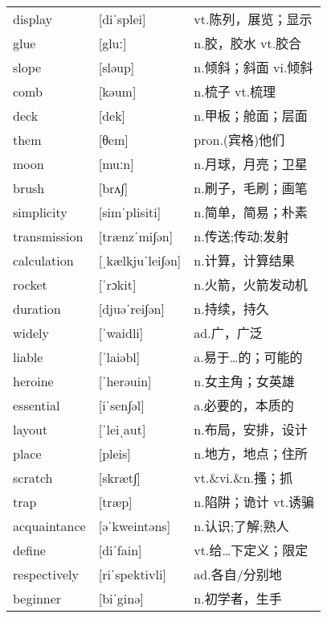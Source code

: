 \documentclass[a4paper]{article}
\begin{document}
\section{}
\begin{tabular}{l l l}

display & [diˈsplei] & vt.陈列，展览；显示 \\
glue & [gluː] & n.胶，胶水 vt.胶合 \\
slope & [sləup] & n.倾斜；斜面 vi.倾斜 \\
comb & [kəum] & n.梳子 vt.梳理 \\
deck & [dek] & n.甲板；舱面；层面 \\
them & [θem] & pron.(宾格)他们 \\
moon & [muːn] & n.月球，月亮；卫星 \\
brush & [brʌ∫] & n.刷子，毛刷；画笔 \\
simplicity & [simˈplisiti] & n.简单，简易；朴素 \\
transmission & [trænzˈmi∫ən] & n.传送;传动;发射 \\
calculation & [ˌkælkjuˈlei∫ən] & n.计算，计算结果 \\
rocket & [ˈrɔkit] & n.火箭，火箭发动机 \\
duration & [djuəˈrei∫ən] & n.持续，持久 \\
widely & [ˈwaidli] & ad.广，广泛 \\
liable & [ˈlaiəbl] & a.易于…的；可能的 \\
heroine & [ˈherəuin] & n.女主角；女英雄 \\
essential & [iˈsen∫əl] & a.必要的，本质的 \\
layout & [ˈleiˌaut] & n.布局，安排，设计 \\
place & [pleis] & n.地方，地点；住所 \\
scratch & [skræt∫] & vt.\&vi.\&n.搔；抓 \\
trap & [træp] & n.陷阱；诡计 vt.诱骗 \\
acquaintance & [əˈkweintəns] & n.认识;了解;熟人 \\
define & [diˈfain] & vt.给…下定义；限定 \\
respectively & [riˈspektivli] & ad.各自/分别地 \\
beginner & [biˈginə] & n.初学者，生手 \\

\end{tabular}
\end{document}
